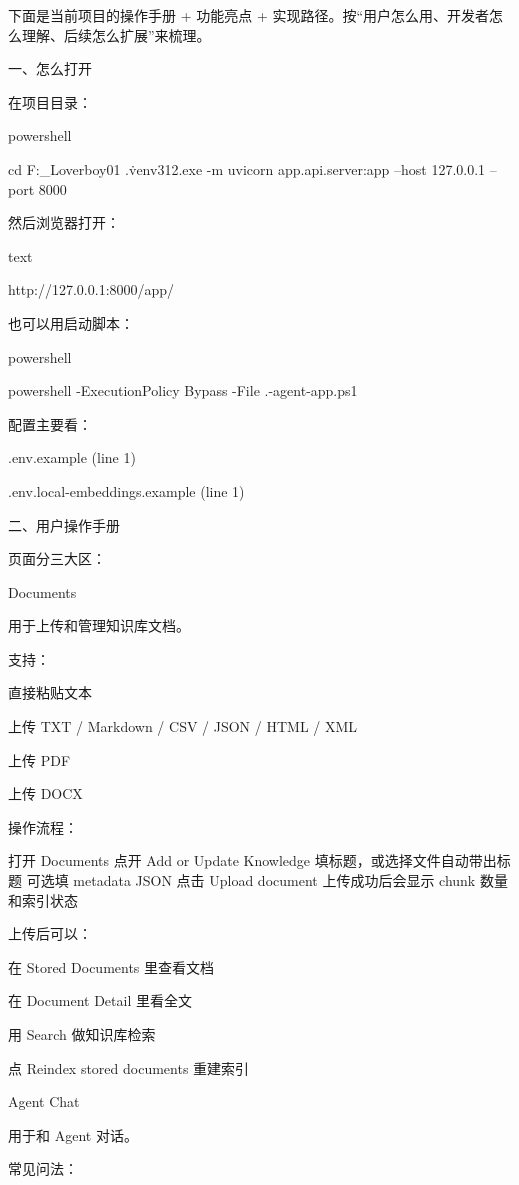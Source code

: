 下面是当前项目的操作手册 + 功能亮点 + 实现路径。按“用户怎么用、开发者怎么理解、后续怎么扩展”来梳理。

一、怎么打开

在项目目录：

powershell



cd F:\Project_Loverboy01
.\.venv312\Scripts\python.exe -m uvicorn app.api.server:app --host 127.0.0.1 --port 8000



然后浏览器打开：

text



http://127.0.0.1:8000/app/



也可以用启动脚本：

powershell



powershell -ExecutionPolicy Bypass -File .\scripts\start-agent-app.ps1



配置主要看：


.env.example (line 1)

.env.local-embeddings.example (line 1)


二、用户操作手册

页面分三大区：


Documents

用于上传和管理知识库文档。

支持：


直接粘贴文本

上传 TXT / Markdown / CSV / JSON / HTML / XML

上传 PDF

上传 DOCX


操作流程：

打开 Documents
点开 Add or Update Knowledge
填标题，或选择文件自动带出标题
可选填 metadata JSON
点击 Upload document
上传成功后会显示 chunk 数量和索引状态

上传后可以：


在 Stored Documents 里查看文档

在 Document Detail 里看全文

用 Search 做知识库检索

点 Reindex stored documents 重建索引




Agent Chat

用于和 Agent 对话。

常见问法：

